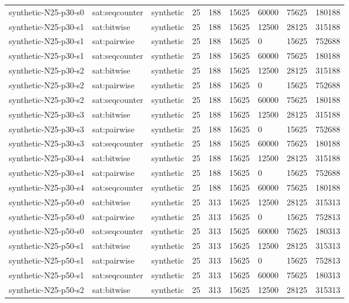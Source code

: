 \begin{tabular}{lllllllll}
synthetic-N25-p30-s0 & sat:seqcounter & synthetic & 25 & 188 & 15625 & 60000 & 75625 & 180188 \\
synthetic-N25-p30-s1 & sat:bitwise & synthetic & 25 & 188 & 15625 & 12500 & 28125 & 315188 \\
synthetic-N25-p30-s1 & sat:pairwise & synthetic & 25 & 188 & 15625 & 0 & 15625 & 752688 \\
synthetic-N25-p30-s1 & sat:seqcounter & synthetic & 25 & 188 & 15625 & 60000 & 75625 & 180188 \\
synthetic-N25-p30-s2 & sat:bitwise & synthetic & 25 & 188 & 15625 & 12500 & 28125 & 315188 \\
synthetic-N25-p30-s2 & sat:pairwise & synthetic & 25 & 188 & 15625 & 0 & 15625 & 752688 \\
synthetic-N25-p30-s2 & sat:seqcounter & synthetic & 25 & 188 & 15625 & 60000 & 75625 & 180188 \\
synthetic-N25-p30-s3 & sat:bitwise & synthetic & 25 & 188 & 15625 & 12500 & 28125 & 315188 \\
synthetic-N25-p30-s3 & sat:pairwise & synthetic & 25 & 188 & 15625 & 0 & 15625 & 752688 \\
synthetic-N25-p30-s3 & sat:seqcounter & synthetic & 25 & 188 & 15625 & 60000 & 75625 & 180188 \\
synthetic-N25-p30-s4 & sat:bitwise & synthetic & 25 & 188 & 15625 & 12500 & 28125 & 315188 \\
synthetic-N25-p30-s4 & sat:pairwise & synthetic & 25 & 188 & 15625 & 0 & 15625 & 752688 \\
synthetic-N25-p30-s4 & sat:seqcounter & synthetic & 25 & 188 & 15625 & 60000 & 75625 & 180188 \\
synthetic-N25-p50-s0 & sat:bitwise & synthetic & 25 & 313 & 15625 & 12500 & 28125 & 315313 \\
synthetic-N25-p50-s0 & sat:pairwise & synthetic & 25 & 313 & 15625 & 0 & 15625 & 752813 \\
synthetic-N25-p50-s0 & sat:seqcounter & synthetic & 25 & 313 & 15625 & 60000 & 75625 & 180313 \\
synthetic-N25-p50-s1 & sat:bitwise & synthetic & 25 & 313 & 15625 & 12500 & 28125 & 315313 \\
synthetic-N25-p50-s1 & sat:pairwise & synthetic & 25 & 313 & 15625 & 0 & 15625 & 752813 \\
synthetic-N25-p50-s1 & sat:seqcounter & synthetic & 25 & 313 & 15625 & 60000 & 75625 & 180313 \\
synthetic-N25-p50-s2 & sat:bitwise & synthetic & 25 & 313 & 15625 & 12500 & 28125 & 315313 \\

\end{tabular}
